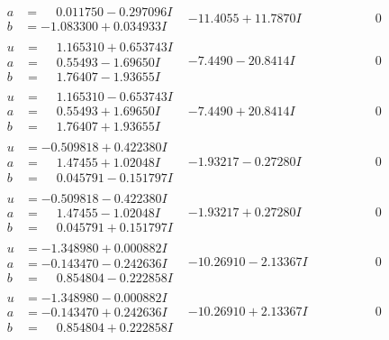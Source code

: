 \documentclass[1p]{elsarticle_modified}
\theoremstyle{definition}
\begin{document}
$$\begin{array}{c|c|c}
\begin{aligned}
a &= \phantom{-}0.011750 - 0.297096 I \\
b &= -1.083300 + 0.034933 I\end{aligned}
 & -11.4055 + 11.7870 I & \phantom{-0.000000 } 0 \\ \hline\begin{aligned}
u &= \phantom{-}1.165310 + 0.653743 I \\
a &= \phantom{-}0.55493 - 1.69650 I \\
b &= \phantom{-}1.76407 - 1.93655 I\end{aligned}
 & -7.4490 - 20.8414 I & \phantom{-0.000000 } 0 \\ \hline\begin{aligned}
u &= \phantom{-}1.165310 - 0.653743 I \\
a &= \phantom{-}0.55493 + 1.69650 I \\
b &= \phantom{-}1.76407 + 1.93655 I\end{aligned}
 & -7.4490 + 20.8414 I & \phantom{-0.000000 } 0 \\ \hline\begin{aligned}
u &= -0.509818 + 0.422380 I \\
a &= \phantom{-}1.47455 + 1.02048 I \\
b &= \phantom{-}0.045791 - 0.151797 I\end{aligned}
 & -1.93217 - 0.27280 I & \phantom{-0.000000 } 0 \\ \hline\begin{aligned}
u &= -0.509818 - 0.422380 I \\
a &= \phantom{-}1.47455 - 1.02048 I \\
b &= \phantom{-}0.045791 + 0.151797 I\end{aligned}
 & -1.93217 + 0.27280 I & \phantom{-0.000000 } 0 \\ \hline\begin{aligned}
u &= -1.348980 + 0.000882 I \\
a &= -0.143470 - 0.242636 I \\
b &= \phantom{-}0.854804 - 0.222858 I\end{aligned}
 & -10.26910 - 2.13367 I & \phantom{-0.000000 } 0 \\ \hline\begin{aligned}
u &= -1.348980 - 0.000882 I \\
a &= -0.143470 + 0.242636 I \\
b &= \phantom{-}0.854804 + 0.222858 I\end{aligned}
 & -10.26910 + 2.13367 I & \phantom{-0.000000 } 0\\

\end{array}$$
\end{document}
